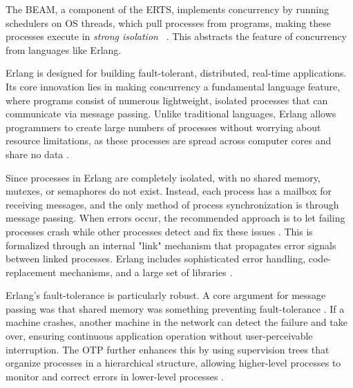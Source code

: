 \documentclass[]{final}
\begin{document}
The BEAM, a component of the ERTS, implements concurrency by running schedulers
on OS threads, which pull processes from programs, making these processes execute in
\textit{strong isolation} ~\cite{stenman_erlang_2024, armstrong_making_2003, debenedetto_elixir_2019}.
This abstracts the feature of concurrency from languages like Erlang.

Erlang is designed for building fault-tolerant, distributed, real-time
applications. Its core innovation lies in making concurrency a fundamental
language feature, where programs consist of numerous lightweight,
isolated processes that can communicate via message passing.
Unlike traditional languages, Erlang allows programmers to
create large numbers of processes without worrying about resource limitations,
as these processes are spread across computer cores and share no data \cite{armstrong_erlang_2010}.

Since processes in Erlang are completely isolated, with no shared memory, mutexes,
or semaphores do not exist. Instead, each process has a mailbox for receiving messages,
and the only method of process synchronization is through message passing.
When errors occur, the recommended approach is to let failing processes
crash while other processes detect and fix these issues \cite{armstrong_erlang_2010}.
This is formalized
through an internal "link" mechanism that propagates error signals between
linked processes. Erlang includes sophisticated error handling, code-replacement
mechanisms, and a large set of libraries \cite{armstrong_erlang_2010}.

Erlang's fault-tolerance is particularly robust.
A core argument for message passing was that shared memory was something
preventing fault-tolerance \cite{armstrong_erlang_2010}.
If a machine crashes, another
machine in the network can detect the failure and take over, ensuring continuous
application operation without user-perceivable interruption. The OTP further
enhances this by using supervision trees that
organize processes in a hierarchical structure, allowing higher-level processes
to monitor and correct errors in lower-level processes \cite{armstrong_erlang_2010}.
\end{document}
